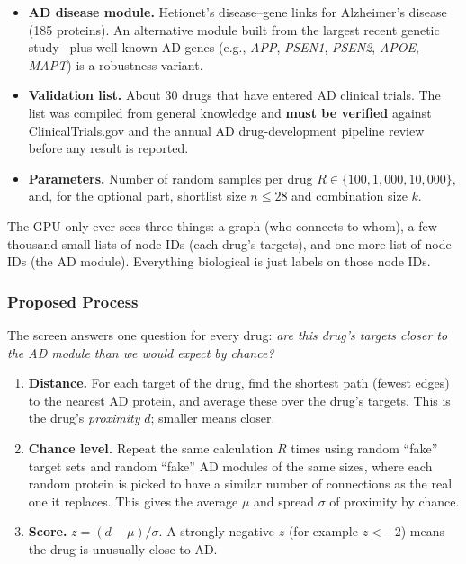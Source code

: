 \begin{itemize}
  \item \textbf{AD disease module.} Hetionet's disease--gene links for Alzheimer's disease (185 proteins). An alternative module built from the largest recent genetic study~\cite{bellenguez2022new} plus well-known AD genes (e.g., \textit{APP}, \textit{PSEN1}, \textit{PSEN2}, \textit{APOE}, \textit{MAPT}) is a robustness variant.
  
  \item \textbf{Validation list.} About 30 drugs that have entered AD clinical trials. The list was compiled from general knowledge and \textbf{must be verified} against ClinicalTrials.gov and the annual AD drug-development pipeline review~\cite{cummings2024pipeline} before any result is reported. 
  
  \item \textbf{Parameters.} Number of random samples per drug $R\in\{100, 1{,}000, 10{,}000\}$, and, for the optional part, shortlist size $n\le 28$ and combination size $k$.
\end{itemize}

The GPU only ever sees three things: a graph (who connects to whom), a few
thousand small lists of node IDs (each drug's targets), and one more list of
node IDs (the AD module). Everything biological is just labels on those
node IDs.

\subsubsection{Proposed Process}

The screen answers one question for every drug: \emph{are this drug's targets
closer to the AD module than we would expect by chance?}

\begin{enumerate}
  \item \textbf{Distance.} For each target of the drug, find the shortest
        path (fewest edges) to the nearest AD protein, and average these over
        the drug's targets. This is the drug's \emph{proximity} $d$; smaller
        means closer.
  \item \textbf{Chance level.} Repeat the same calculation $R$ times using
        random ``fake'' target sets and random ``fake'' AD modules of the same
        sizes, where each random protein is picked to have a similar number
        of connections as the real one it replaces. This gives the average
        $\mu$ and spread $\sigma$ of proximity by chance.
  \item \textbf{Score.} $z = (d-\mu)/\sigma$. A strongly negative $z$ (for
        example $z < -2$) means the drug is unusually close to AD.
\end{enumerate}

